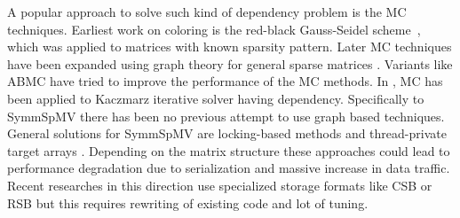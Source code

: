 A popular approach to solve such kind of dependency problem is  the
\acrfull{MC} techniques. Earliest work on coloring is the red-black 
Gauss-Seidel scheme~\cite{RBGS}, which was applied to  matrices with
 known sparsity pattern. 
Later \acrlong{MC} techniques have been expanded using graph theory
for general sparse matrices \cite{MC, COLPACK}.
Variants like \acrfull{ABMC} \cite{ABMC} have tried to improve the performance 
of the \acrshort{MC} methods. 
In \cite{feast_mc}, \acrshort{MC} has been applied to Kaczmarz iterative solver
having \DTWO dependency.
Specifically to \acrshort{SymmSpMV} there has been no previous attempt to use 
graph based techniques. General solutions for \acrshort{SymmSpMV} are 
locking-based methods and thread-private target arrays \cite{sparseX,thread_private_symm_spmv}.
Depending on the matrix structure these approaches could lead to performance
 degradation  due to serialization and massive increase in data traffic.
Recent researches in this direction use specialized storage formats like
 CSB \cite{CSB} or RSB \cite{RSB} but this requires rewriting of existing 
 code and lot of tuning. 

 


